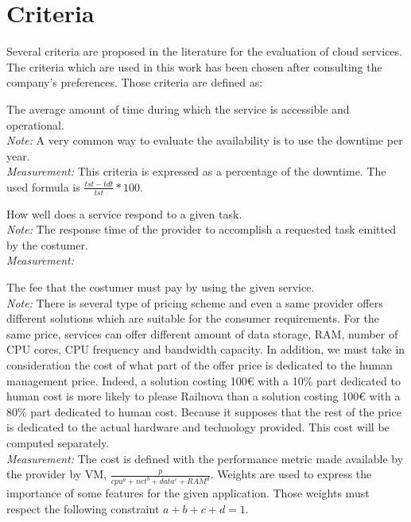 \documentclass[a4paper,11pt]{article}
\begin{document}
\section{Criteria}
Several criteria are proposed in the literature for the evaluation of cloud services. The criteria which are used in this work has been chosen after consulting the company's preferences.
Those criteria are defined as:
\begin{description}[parsep=1pt,listparindent=\parindent,labelindent=\parindent,font=$\bullet$\ ]
  \item[Availability:] The average amount of time during which the service is accessible and operational.\\
    \emph{Note:} A very common way to evaluate the availability is to use the downtime per year.\\
    \emph{Measurement:} This criteria is expressed as a percentage of the downtime. The used formula is $\frac{tst-tdt}{tst}*100$.

  \item[Service efficiency:] How well does a service respond to a given task.\\
    \emph{Note:} The response time of the provider to accomplish a requested task emitted by the costumer.\\
    \emph{Measurement:} 

  \item[Cost:] The fee that the costumer must pay by using the given service.\\
    \emph{Note:} There is several type of pricing scheme and even a same provider offers different solutions which are suitable for the consumer requirements. For the same price, services can offer different amount of data storage, RAM, number of CPU cores, CPU frequency and bandwidth capacity. In addition, we must take in consideration the cost of what part of the offer price is dedicated to the human management price. Indeed, a solution costing 100\euro{} with a 10\% part dedicated to human cost is more likely to please Railnova than a solution costing 100\euro{} with a 80\% part dedicated to human cost. Because it supposes that the rest of the price is dedicated to the actual hardware and technology provided. This cost will be computed separately.\\
    \emph{Measurement:} The cost is defined with the performance metric made available by the provider by VM, $\frac{p}{cpu^a + net^b + data^c + RAM^d}$. Weights are used to express the importance of some features for the given application. Those weights must respect the following constraint $a+b+c+d=1$.


\end{description}
\end{document}
